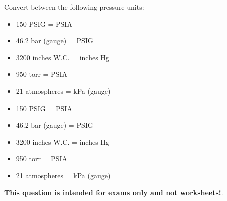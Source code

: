 

Convert between the following pressure units:

\begin{itemize}
\item{} 150 PSIG = \underbar{\hskip 50pt} PSIA
\vskip 10pt
\item{} 46.2 bar (gauge) = \underbar{\hskip 50pt} PSIG
\vskip 10pt
\item{} 3200 inches W.C. = \underbar{\hskip 50pt} inches Hg 
\vskip 10pt
\item{} 950 torr = \underbar{\hskip 50pt} PSIA 
\vskip 10pt
\item{} 21 atmospheres = \underbar{\hskip 50pt} kPa (gauge) 
\end{itemize}







\begin{itemize}
\item{} 150 PSIG =  PSIA
\item{} 46.2 bar (gauge) =  PSIG
\item{} 3200 inches W.C. =  inches Hg 
\item{} 950 torr =  PSIA 
\item{} 21 atmospheres =  kPa (gauge) 
\end{itemize}







{\bf This question is intended for exams only and not worksheets!}.



